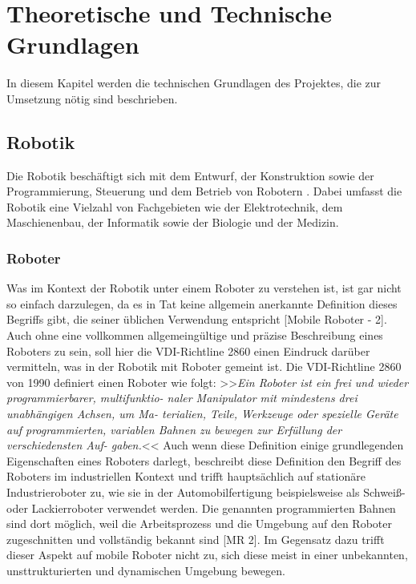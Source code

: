 \section{Theoretische und Technische Grundlagen}

In diesem Kapitel werden die technischen Grundlagen des Projektes, die zur Umsetzung nötig sind beschrieben.

\subsection{Robotik} %
\color{finishing}
Die Robotik beschäftigt sich mit dem Entwurf, der Konstruktion sowie der Programmierung, Steuerung und dem Betrieb 
von Robotern . Dabei umfasst die Robotik eine Vielzahl 
von Fachgebieten wie der Elektrotechnik, dem Maschienenbau, der Informatik sowie der Biologie und der Medizin.
\subsubsection{Roboter}
\color{finishing}
Was im Kontext der Robotik unter einem Roboter zu verstehen ist, ist gar nicht so einfach darzulegen, da es in Tat keine allgemein anerkannte Definition dieses Begriffs gibt, die seiner üblichen Verwendung entspricht [Mobile Roboter - 2].
\newline
Auch ohne eine vollkommen allgemeingültige und präzise Beschreibung eines Roboters zu sein, soll hier die VDI-Richtline 2860 einen Eindruck darüber vermitteln, was in der Robotik mit Roboter gemeint ist. \newline
Die VDI-Richtline 2860 von 1990 definiert einen Roboter wie folgt:
\vspace{2mm}
\newline
>>\textit{Ein Roboter ist ein frei und wieder programmierbarer, multifunktio-
naler Manipulator mit mindestens drei unabhängigen Achsen, um Ma-
terialien, Teile, Werkzeuge oder spezielle Geräte auf programmierten,
variablen Bahnen zu bewegen zur Erfüllung der verschiedensten Auf-
gaben.}<<
\vspace{2mm}
\newline
Auch wenn diese Definition einige grundlegenden Eigenschaften eines Roboters darlegt, beschreibt diese Definition den Begriff des Roboters im industriellen Kontext und trifft hauptsächlich auf stationäre Industrieroboter zu, wie sie in der Automobilfertigung beispielsweise als Schweiß- oder Lackierroboter verwendet werden. Die genannten programmierten Bahnen sind dort möglich, weil die Arbeitsprozess und die Umgebung auf den Roboter zugeschnitten und vollständig bekannt sind [MR 2]. \newline
Im Gegensatz dazu trifft dieser Aspekt auf mobile Roboter nicht zu, sich diese meist in einer unbekannten, unsttrukturierten und dynamischen Umgebung bewegen.
